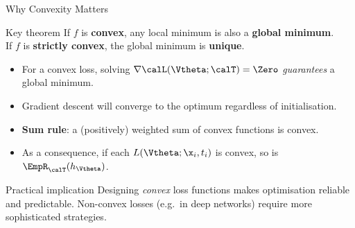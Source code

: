 \begin{frame}{Why Convexity Matters}
  \begin{alertblock}{Key theorem}
    If $f$ is \textbf{convex}, any local minimum is also a \textbf{global minimum}.\\
    If $f$ is \textbf{strictly convex}, the global minimum is \textbf{unique}.
  \end{alertblock}

  \vspace{.5em}
  \begin{itemize}
    \item For a convex loss, solving $\nabla\calL(\Vtheta;\calT)=\Zero$ \emph{guarantees} a global minimum.
    \item Gradient descent will converge to the optimum regardless of initialisation.
    \item \textbf{Sum rule}: a (positively) weighted sum of convex functions is convex.
    \item As a consequence, if each $L(\Vtheta;\x_i,t_i)$ is convex, so is $\EmpR_{\calT}{(h_{\Vtheta})}$.
  \end{itemize}

  \vspace{.5em}
  \begin{exampleblock}{Practical implication}
    Designing \emph{convex} loss functions makes optimisation reliable and predictable.
    Non-convex losses (e.g.\ in deep networks) require more sophisticated strategies.
  \end{exampleblock}
\end{frame}

